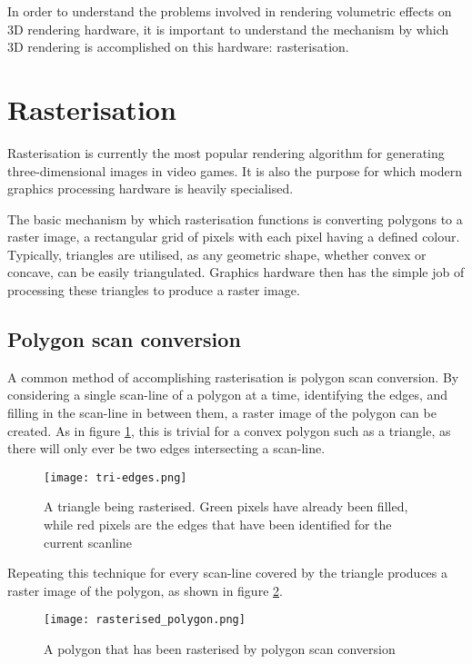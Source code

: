 In order to understand the problems involved in rendering volumetric effects on 3D rendering hardware, it is important to understand the mechanism by which 3D rendering is accomplished on this hardware: rasterisation.

\section{Rasterisation}
Rasterisation is currently the most popular rendering algorithm for generating three-dimensional images in video games. It is also the purpose for which modern graphics processing hardware is heavily specialised.

The basic mechanism by which rasterisation functions is converting polygons to a raster image, a rectangular grid of pixels with each pixel having a defined colour. Typically, triangles are utilised, as any geometric shape, whether convex or concave, can be easily triangulated. Graphics hardware then has the simple job of processing these triangles to produce a raster image.

\subsection{Polygon scan conversion}
\label{pct}
A common method of accomplishing rasterisation is polygon scan conversion. By considering a single scan-line of a polygon at a time, identifying the edges, and filling in the scan-line in between them, a raster image of the polygon can be created. As in figure \ref{fig:tri-edges}, this is trivial for a convex polygon such as a triangle, as there will only ever be two edges intersecting a scan-line.

\begin{figure}
\centering
	\texttt{[image: tri-edges.png]}
	\caption{A triangle being rasterised. Green pixels have already been filled, while red pixels are the edges that have been identified for the current scanline}
	\label{fig:tri-edges}
\end{figure}

Repeating this technique for every scan-line covered by the triangle produces a raster image of the polygon, as shown in figure \ref{fig:rasterised_polygon}.

\begin{figure}
\centering
	\texttt{[image: rasterised\_polygon.png]}
	\caption{A polygon that has been rasterised by polygon scan conversion}
	\label{fig:rasterised_polygon}
\end{figure}

